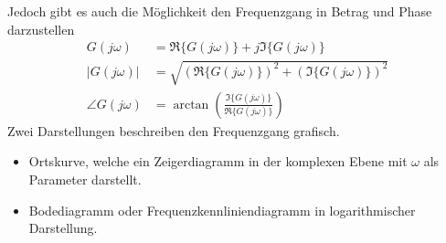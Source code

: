 %
Jedoch gibt es auch die Möglichkeit den Frequenzgang in Betrag und Phase darzustellen
%
\begin{equation*}
\begin{aligned}
G(j\omega)&=\Re\{G(j\omega)\}+j\Im\{G(j\omega)\}\\
\left|G(j\omega)\right|&=\sqrt{\left(\Re\{G(j\omega)\}\right)^{2}+\left(\Im\{G(j\omega)\}\right)^{2}}\\
\angle G(j\omega)&=\arctan\left(\frac{\Im\{G(j\omega)\}}{\Re\{G(j\omega)\}}\right)
\end{aligned}
\end{equation*}
%
Zwei Darstellungen beschreiben den Frequenzgang grafisch.
%
\begin{itemize}
	\item Ortskurve, welche ein Zeigerdiagramm in der komplexen Ebene mit $\omega$ als Parameter darstellt.
	\item Bodediagramm oder Frequenzkennliniendiagramm in logarithmischer Darstellung.
\end{itemize}
%
